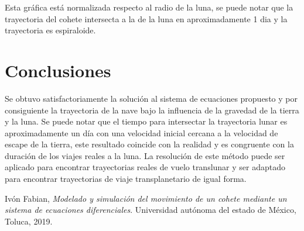 \documentclass{article}
\begin{document}
Esta gráfica está normalizada respecto al radio de la luna, se puede notar que la trayectoria del cohete intersecta a la de la luna en aproximadamente 1 dia y la trayectoria es espiraloide.
\section{Conclusiones}
Se obtuvo satisfactoriamente la solución al sistema de ecuaciones propuesto y por consiguiente la trayectoria de la nave bajo la influencia de la gravedad de la tierra y la luna.
Se puede notar que el tiempo para intersectar la trayectoria lunar es aproximadamente un día con una velocidad inicial cercana a la velocidad de escape de la tierra, este resultado coincide con la realidad y es congruente con la duración de los viajes reales a la luna.
La resolución de este método puede ser aplicado para encontrar trayectorias reales de vuelo translunar y ser adaptado para encontrar trayectorias de viaje transplanetario de igual forma.

\begin{thebibliography}{1}
	
	Ivón Fabian,  
	\textit{Modelado y simulación del movimiento de un cohete mediante un sistema de ecuaciones diferenciales}. 
	Universidad autónoma del estado de México, Toluca, 2019.
\end{thebibliography}
\end{document}
